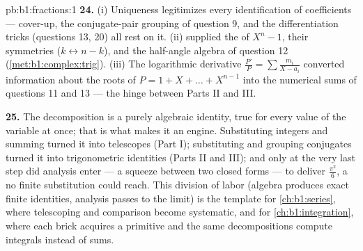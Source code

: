 \begin{solution}{pb:b1:fractions:1}
\textbf{24.} (i) Uniqueness legitimizes every identification of
coefficients --- cover-up, the conjugate-pair grouping of
question 9, and the differentiation tricks (questions 13, 20)
all rest on it. (ii)  supplied the  of $X^n -
1$, their symmetries ($k \leftrightarrow n-k$), and the
half-angle algebra of question 12
(\cref{met:b1:complex:trig}). (iii) The logarithmic derivative
$\frac{P'}P = \sum\frac{m_i}{X-a_i}$ converted information about
the roots of $P = 1 + X + \dots + X^{n-1}$ into the numerical
sums of questions 11 and 13 --- the hinge between Parts II and
III.

\textbf{25.} The decomposition is a purely algebraic identity,
true for every value of the variable at once; that is what makes
it an engine. Substituting integers and summing turned it into
telescopes (Part I); substituting  and grouping
conjugates turned it into trigonometric identities (Parts II and
III); and only at the very last step did analysis enter --- a
squeeze between two closed forms --- to deliver $\frac{\pi^2}6$,
a  no finite substitution could reach. This division of
labor (algebra produces exact finite identities, analysis passes
to the limit) is the template for \cref{ch:b1:series}, where
telescoping and comparison become systematic, and for
\cref{ch:b1:integration}, where each brick acquires a primitive
and the same decompositions compute integrals instead of sums.
\end{solution}

